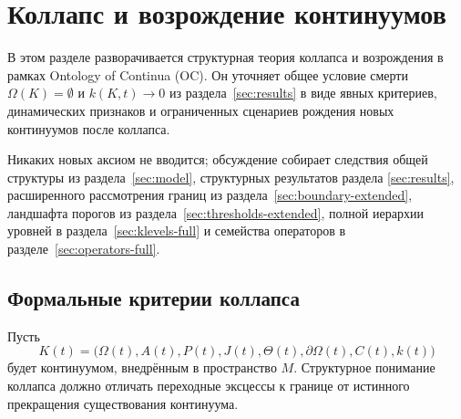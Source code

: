 
\section{Коллапс и возрождение континуумов}
\label{sec:collapse-rebirth}

В этом разделе разворачивается структурная теория коллапса и возрождения
в рамках Ontology of Continua (OC). Он уточняет общее условие смерти
\(\Omega(K)=\emptyset\) и \(k(K,t)\to 0\) из
раздела~\ref{sec:results} в виде явных критериев, динамических признаков и
ограниченных сценариев рождения новых континуумов после коллапса.

Никаких новых аксиом не вводится; обсуждение собирает следствия общей
структуры из раздела~\ref{sec:model}, структурных результатов раздела
\ref{sec:results}, расширенного рассмотрения границ из
раздела~\ref{sec:boundary-extended}, ландшафта порогов из
раздела~\ref{sec:thresholds-extended}, полной иерархии уровней в
раздела~\ref{sec:klevels-full} и семейства операторов в
разделе~\ref{sec:operators-full}.

\subsection{Формальные критерии коллапса}

Пусть
\[
  K(t) =
  \big(
    \Omega(t), A(t), P(t), J(t),
    \Theta(t), \partial\Omega(t), C(t), k(t)
  \big)
\]
будет континуумом, внедрённым в пространство \(M\). Структурное понимание
коллапса должно отличать переходные эксцессы к границе от истинного прекращения
существования континуума.

